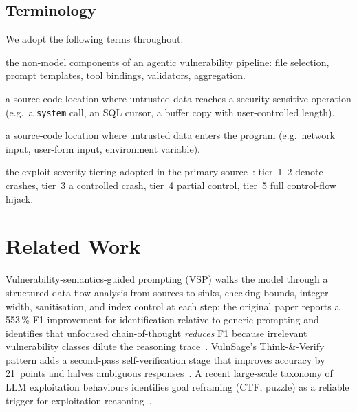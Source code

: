 \documentclass[11pt,a4paper]{article}
\begin{document}
\subsection{Terminology}

We adopt the following terms throughout:

\begin{description}[leftmargin=14pt,style=nextline,font=\normalfont\itshape]
  \item[Scaffold] the non-model components of an agentic vulnerability
  pipeline: file selection, prompt templates, tool bindings,
  validators, aggregation.
  \item[Sink] a source-code location where untrusted data reaches a
  security-sensitive operation (e.g.\ a \texttt{system} call, an SQL
  cursor, a buffer copy with user-controlled length).
  \item[Source] a source-code location where untrusted data enters the
  program (e.g.\ network input, user-form input, environment variable).
  \item[Tier 1--5] the exploit-severity tiering adopted in the primary
  source~\citep{anthropicMythos2026}: tier~1--2 denote crashes, tier~3 a
  controlled crash, tier~4 partial control, tier~5 full
  control-flow hijack.
\end{description}

\section{Related Work}
\label{sec:related}

Vulnerability-semantics-guided prompting (VSP) walks the model through a
structured data-flow analysis from sources to sinks, checking bounds,
integer width, sanitisation, and index control at each step; the original
paper reports a 553\,\% F1 improvement for identification relative to
generic prompting and identifies that unfocused chain-of-thought
\emph{reduces} F1 because irrelevant vulnerability classes dilute the
reasoning trace~\citep{vsp2024}. VulnSage's Think-\&-Verify pattern adds a
second-pass self-verification stage that improves accuracy by 21~points and
halves ambiguous responses~\citep{vulnSage2025}. A recent large-scale
taxonomy of LLM exploitation behaviours identifies goal reframing (CTF,
puzzle) as a reliable trigger for exploitation reasoning~\citep{taxonomy2026}.
\end{document}
